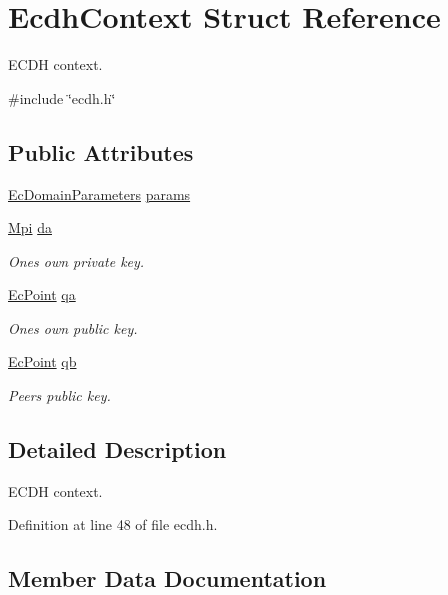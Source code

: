 \hypertarget{structEcdhContext}{}\section{Ecdh\+Context Struct Reference}
\label{structEcdhContext}


E\+C\+DH context.  




{\ttfamily \#include \char`\"{}ecdh.\+h\char`\"{}}

\subsection*{Public Attributes}
\begin{DoxyCompactItemize}
\item 
\hyperlink{structEcDomainParameters}{Ec\+Domain\+Parameters} \hyperlink{structEcdhContext_ad7a1d278081f5d47410da42c58e248df}{params}
\item 
\hyperlink{structMpi}{Mpi} \hyperlink{structEcdhContext_a0af39ae4834d4f4106c7c0224e6a52bd}{da}
\begin{DoxyCompactList}\small\item\em One\textquotesingle{}s own private key. \end{DoxyCompactList}\item 
\hyperlink{structEcPoint}{Ec\+Point} \hyperlink{structEcdhContext_aee88c6acd90bffb45a74fa3280b0328a}{qa}
\begin{DoxyCompactList}\small\item\em One\textquotesingle{}s own public key. \end{DoxyCompactList}\item 
\hyperlink{structEcPoint}{Ec\+Point} \hyperlink{structEcdhContext_a1de1436bb839104e2a7be87598a33a5d}{qb}
\begin{DoxyCompactList}\small\item\em Peer\textquotesingle{}s public key. \end{DoxyCompactList}\end{DoxyCompactItemize}


\subsection{Detailed Description}
E\+C\+DH context. 

Definition at line 48 of file ecdh.\+h.



\subsection{Member Data Documentation}
\mbox{\label{structEcdhContext_a0af39ae4834d4f4106c7c0224e6a52bd}} 
